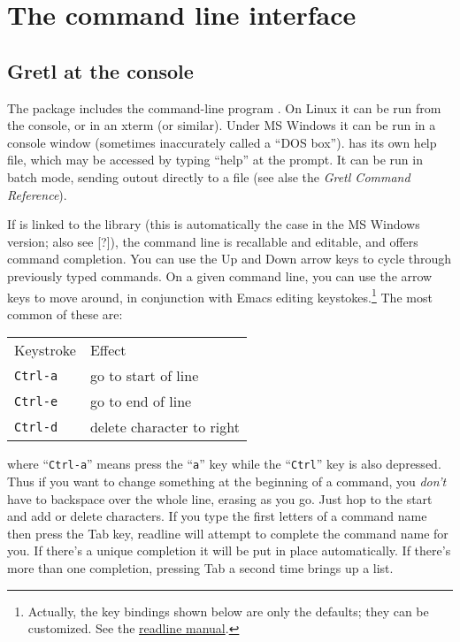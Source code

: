\chapter{The command line interface}
\label{cli}



\section{Gretl at the console}
\label{cli-console}


The  package includes the command-line program
. On Linux it can be run from the console, or in an
xterm (or similar).  Under MS Windows it can be run in a console
window (sometimes inaccurately called a ``DOS box'').  
has its own help file, which may be accessed by typing ``help'' at the
prompt. It can be run in batch mode, sending outout directly to a file
(see alse the \emph{Gretl Command Reference}).
    
If  is linked to the  library (this is
automatically the case in the MS Windows version; also see [?]), the
command line is recallable and editable, and offers command
completion.  You can use the Up and Down arrow keys to cycle through
previously typed commands.  On a given command line, you can use the
arrow keys to move around, in conjunction with Emacs editing
keystokes.\footnote{Actually, the key bindings shown below are only
  the defaults; they can be customized.  See the
  \href{http://cnswww.cns.cwru.edu/~chet/readline/readline.html}{readline
    manual}.} The most common of these are:
%    
\begin{center}
  \begin{tabular}{ll}
    Keystroke & Effect\\
    \verb+Ctrl-a+ & go to start of line\\
    \verb+Ctrl-e+ & go to end of line\\
    \verb+Ctrl-d+ & delete character to right\\
  \end{tabular}
\end{center}
%
where ``\verb+Ctrl-a+'' means press the ``\verb+a+'' key while the
``\verb+Ctrl+'' key is also depressed.  Thus if you want to change
something at the beginning of a command, you \emph{don't} have to
backspace over the whole line, erasing as you go.  Just hop to the
start and add or delete characters.  If you type the first letters of
a command name then press the Tab key, readline will attempt to
complete the command name for you.  If there's a unique completion it
will be put in place automatically.  If there's more than one
completion, pressing Tab a second time brings up a list.

